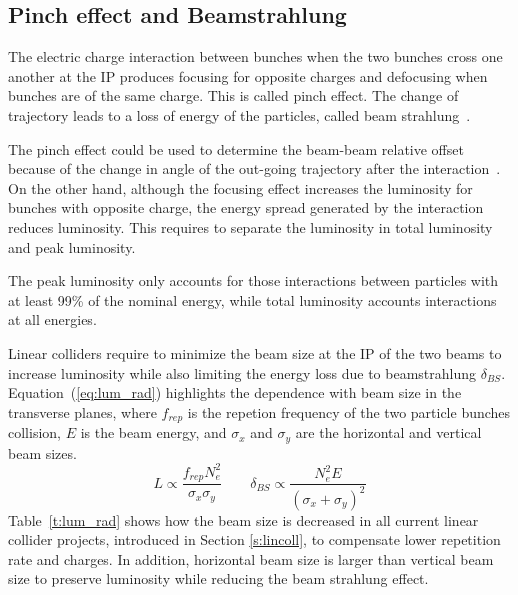 \subsection{Pinch effect and Beamstrahlung}\label{s:beastr}
The electric charge interaction between bunches when the two bunches cross one another at the IP produces focusing for opposite charges and defocusing when bunches are of the same charge. This is called pinch effect. The change of trajectory leads to a loss of energy of the particles, called beam strahlung~\cite{Schulte:331845}.\par
The pinch effect could be used to determine the beam-beam relative offset because of the change in angle of the out-going trajectory after the interaction~\cite{Bambade:1989pb}. On the other hand, although the focusing effect increases the luminosity for bunches with opposite charge, the energy spread generated by the interaction reduces luminosity. This requires to separate the luminosity in total luminosity and peak luminosity.\par
The peak luminosity only accounts for those interactions between particles with at least 99\% of the nominal energy, while total luminosity accounts interactions at all energies.\par
Linear colliders require to minimize the beam size at the IP of the two beams to increase luminosity while also limiting the energy loss due to beamstrahlung $\delta_{BS}$. Equation~(\ref{eq:lum_rad}) highlights the dependence with beam size in the transverse planes, where $f_{rep}$ is the repetion frequency of the two particle bunches collision, $E$ is the beam energy, and $\sigma_x$ and $\sigma_y$ are the horizontal and vertical beam sizes.
\begin{equation}
 L \propto \frac{f_{rep}N_e^2}{\sigma_x\sigma_y}\qquad\delta_{BS}\propto\frac{N_e^2E}{(\sigma_x+\sigma_y)^2}\label{eq:lum_rad}
\end{equation}
Table~\ref{t:lum_rad} shows how the beam size is decreased in all current linear collider projects, introduced in Section \ref{s:lincoll}, to compensate lower repetition rate and charges. In addition, horizontal beam size is larger than vertical beam size to preserve luminosity while reducing the beam strahlung effect.\par
